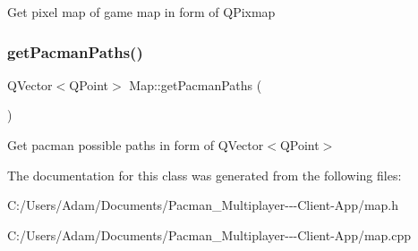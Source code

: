 Get pixel map of game map in form of Q\+Pixmap \mbox{\label{class_map_aee970930932db68180c88ba37c488fc3}} 
\subsubsection{\texorpdfstring{get\+Pacman\+Paths()}{getPacmanPaths()}}
{\footnotesize\ttfamily Q\+Vector$<$Q\+Point$>$ Map\+::get\+Pacman\+Paths (\begin{DoxyParamCaption}{ }\end{DoxyParamCaption})\hspace{0.3cm}{\ttfamily [inline]}}

Get pacman possible paths in form of Q\+Vector$<$\+Q\+Point$>$ 

The documentation for this class was generated from the following files\+:\begin{DoxyCompactItemize}
\item 
C\+:/\+Users/\+Adam/\+Documents/\+Pacman\+\_\+\+Multiplayer-\/-\/-\/\+Client-\/\+App/map.\+h\item 
C\+:/\+Users/\+Adam/\+Documents/\+Pacman\+\_\+\+Multiplayer-\/-\/-\/\+Client-\/\+App/map.\+cpp\end{DoxyCompactItemize}
